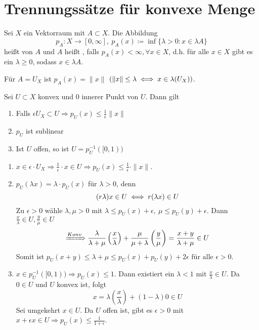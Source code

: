 

\section{Trennungssätze für konvexe Menge}


\begin{definition}
	Sei $X$ ein Vektorraum mit $A \subset X$. Die Abbildung 
		\[ p_{A} \colon X \rightarrow [0, \infty], ~ p_{A}(x) \coloneqq \inf \{ \lambda > 0 : x \in \lambda A \} \]
		hei{\ss}t  von $A$ und $A$ hei{\ss}t , falls $p_{A}(x) < \infty, \forall x \in X$, d.h. für alle $ x \in X$ gibt es ein $\lambda \geq 0$, sodass $x \in \lambda A$.
\end{definition}


\begin{beispiel}
	Für $A = U_{X}$ ist $p_{A}(x) = \| x \|$ $\left( \| x \| \leq \lambda \iff x \in \lambda (U_{X})\right)$.
\end{beispiel}


\begin{prop} \label{prop:21.3}
	Sei $U \subset X$ konvex und $0$ innerer Punkt von $U$. Dann gilt
	\begin{enumerate}[label=\alph*\upshape)]
		\item Falls $\epsilon U_{X} \subset U \Rightarrow p_{U}(x) \leq \frac{1}{\epsilon} \| x \|$
		\item $p_{U}$ ist sublinear
		\item Ist $U$ offen, so ist $U = p_{U}^{-1}([0 , 1))$
	\end{enumerate}	
\end{prop}

\begin{beweis}
	\begin{enumerate}[label=\alph*\upshape)]
		\item $x \in \epsilon \cdot U_{X} \Rightarrow \frac{1}{\epsilon} \cdot x \in U \Rightarrow p_{U}(x) \leq \frac{1}{\epsilon} \cdot \| x \|$.
		\item $p_{U}(\lambda x ) = \lambda \cdot p_{U}(x)$ für $\lambda > 0$, denn 
			\[ (r \lambda) x \in U \iff r(\lambda x) \in U \] 
			Zu $\epsilon > 0$ wähle $\lambda, \mu > 0$ mit  $\lambda \leq p_{U}(x) + \epsilon, ~\mu \leq p_{U}(y) + \epsilon$. Dann $\frac{x}{\lambda} \in U, \frac{y}{\mu} \in U$ 
			\[ \xRightarrow[]{Konv} \frac{\lambda}{\lambda + \mu} \left( \frac{x}{\lambda} \right) + \frac{\mu}{\mu + \lambda} \left( \frac{y}{\mu} \right) = \frac{x + y}{\lambda + \mu} \in U \]
			Somit ist $p_{U}(x + y) \leq \lambda + \mu \leq p_{U}(x) + p_{U}(y) + 2 \epsilon \text{ für alle } \epsilon > 0$.
		\item $x \in p_{U}^{-1}([0, 1)) \Rightarrow p_{U}(x) \leq 1$. Dann existiert ein $\lambda < 1$ mit $\frac{x}{\lambda} \in U$. Da $0 \in U$ und $U$ konvex ist, folgt
			\[ x = \lambda \left( \frac{x}{\lambda} \right) + (1 - \lambda) 0 \in U \]
			Sei umgekehrt $x \in U$. Da $U$ offen ist, gibt es $\epsilon > 0$ mit $x + \epsilon x \in U \Rightarrow p_{U}(x) \leq \frac{1}{1 + \epsilon}$.
	\end{enumerate}
\end{beweis}


